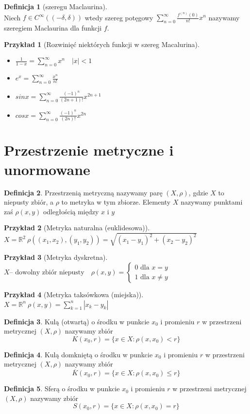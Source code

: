 \documentclass[12pt,a4paper]{article}
\newtheorem{przyklad}{Przykład}
\theoremstyle{definition}
\newtheorem{df}{Definicja}
\begin{document}
\begin{df}[szeregu Maclaurina]~\\
Niech $f\in C^\infty ((-\delta, \delta))$ wtedy szereg potęgowy $\sum\limits_{n=0}^\infty \frac{f^{(n)}(0)}{n!}x^n$ nazywamy szeregiem Maclaurina dla funkcji $f$.
\end{df}

\begin{przyklad}[Rozwinięć niektórych funkcji w szereg Macalurina]~\\
\begin{itemize}
	\item $\frac{1}{1-x} = \sum\limits_{n=0}^\infty x^n \quad |x| < 1$
	\item $e^x = \sum\limits_{n=0}^\infty \frac{x^n}{n!}$
	\item $sinx = \sum\limits_{n=0}^\infty \frac{(-1)^n}{(2n+1)!}x^{2n+1}$
	\item $cosx = \sum\limits_{n=0}^\infty \frac{(-1)^n}{(2n)!}x^{2n}$
\end{itemize}
\end{przyklad}

\section{Przestrzenie metryczne i unormowane}
\begin{df}
Przestrzenią metryczną nazywamy parę $(X, \rho)$, gdzie $X$ to niepusty zbiór, a $\rho$ to metryka w tym zbiorze. Elementy $X$ nazywamy punktami zaś $\rho (x,y)$ odległością między $x$ i $y$ 
\end{df}
\begin{przyklad}[Metryka naturalna (euklidesowa)]
$X = \mathbb{R}^2 ~\rho((x_1,x_2),(y_1, y_2)) = \sqrt{(x_1-y_1)^2+(x_2-y_2)^2}$
\end{przyklad}
\begin{przyklad}[Metryka dyskretna]
$X \text{-- dowolny zbiór niepusty} \quad \rho(x,y) = 
\begin{cases}
0 \text{ dla } x = y\\
1 \text{ dla } x \neq y
\end{cases}$
\end{przyklad}
\begin{przyklad}[Metryka taksówkowa (miejska)]
$X = \mathbb{R}^n ~\rho(x, y) = \sum\limits_{k=1}^n |x_k-y_k|$
\end{przyklad}

\begin{df}
Kulą (otwartą) o środku w punkcie $x_0$ i promieniu $r$ w przestrzeni metrycznej $(X, \rho)$ nazywamy zbiór $$K(x_0, r) = \{x\in X: \rho(x,x_0) < r\}$$
\end{df}
\begin{df}
Kulą domkniętą o środku w punkcie $x_0$ i promieniu $r$ w przestrzeni metrycznej $(X, \rho)$ nazywamy zbiór $$\overline{K}(x_0, r) = \{x\in X: \rho(x,x_0) \leqslant r\}$$
\end{df}
\begin{df}
Sferą o środku w punkcie $x_0$ i promieniu $r$ w przestrzeni metrycznej $(X, \rho)$ nazywamy zbiór $$S(x_0, r) = \{x\in X: \rho(x,x_0) = r\}$$
\end{df}
\end{document}
